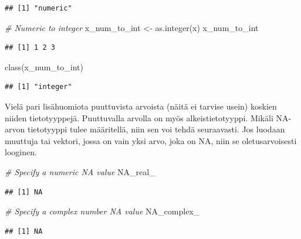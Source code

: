 \documentclass[
]{book}
\newenvironment{Shaded}{\begin{snugshade}}{\end{snugshade}}
\newcommand{\CommentTok}[1]{\textcolor[rgb]{0.56,0.35,0.01}{\textit{#1}}}
\newcommand{\ConstantTok}[1]{\textcolor[rgb]{0.00,0.00,0.00}{#1}}
\newcommand{\FunctionTok}[1]{\textcolor[rgb]{0.00,0.00,0.00}{#1}}
\newcommand{\NormalTok}[1]{#1}
\newcommand{\OtherTok}[1]{\textcolor[rgb]{0.56,0.35,0.01}{#1}}
\begin{document}
\begin{verbatim}
## [1] "numeric"
\end{verbatim}

\begin{Shaded}
\begin{Highlighting}[]
\CommentTok{\# Numeric to integer}
\NormalTok{x\_num\_to\_int }\OtherTok{\textless{}{-}} \FunctionTok{as.integer}\NormalTok{(x)}
\NormalTok{x\_num\_to\_int}
\end{Highlighting}
\end{Shaded}

\begin{verbatim}
## [1] 1 2 3
\end{verbatim}

\begin{Shaded}
\begin{Highlighting}[]
\FunctionTok{class}\NormalTok{(x\_num\_to\_int)}
\end{Highlighting}
\end{Shaded}

\begin{verbatim}
## [1] "integer"
\end{verbatim}

Vielä pari lisähuomiota puuttuvista arvoista (näitä ei tarvise usein) koskien niiden tietotyyppejä. Puuttuvalla arvolla on myös alkeistietotyyppi. Mikäli NA-arvon tietotyyppi tulee määritellä, niin sen voi tehdä seuraavasti. Jos luodaan muuttuja tai vektori, jossa on vain yksi arvo, joka on NA, niin se oletusarvoisesti looginen.

\begin{Shaded}
\begin{Highlighting}[]
\CommentTok{\# Specify a numeric NA value}
\ConstantTok{NA\_real\_}
\end{Highlighting}
\end{Shaded}

\begin{verbatim}
## [1] NA
\end{verbatim}

\begin{Shaded}
\begin{Highlighting}[]
\CommentTok{\# Specify a complex number NA value}
\ConstantTok{NA\_complex\_}
\end{Highlighting}
\end{Shaded}

\begin{verbatim}
## [1] NA
\end{verbatim}
\end{document}
